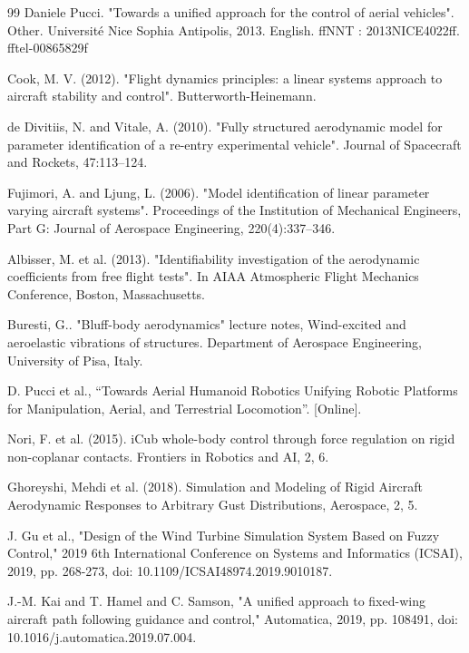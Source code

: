 \begin{thebibliography}{99}
 Daniele Pucci. "Towards a unified approach for the control of aerial vehicles". Other. Université Nice Sophia Antipolis, 2013. English. ffNNT : 2013NICE4022ff. fftel-00865829f

 Cook, M. V. (2012). "Flight dynamics principles: a linear systems approach to aircraft stability and control". Butterworth-Heinemann.

 de Divitiis, N. and Vitale, A. (2010). "Fully structured aerodynamic model for parameter identification of a re-entry experimental vehicle". Journal of Spacecraft and Rockets, 47:113–124.

 Fujimori, A. and Ljung, L. (2006). "Model identification of linear parameter varying aircraft systems". Proceedings of the Institution of Mechanical Engineers, Part G: Journal of Aerospace Engineering, 220(4):337–346.

 Albisser, M. et al. (2013). "Identifiability investigation of the aerodynamic coefficients from free flight tests". In AIAA Atmospheric Flight
Mechanics Conference, Boston, Massachusetts.

 Buresti, G.. "Bluff-body aerodynamics" lecture notes, Wind-excited and aeroelastic vibrations of structures. Department of Aerospace Engineering, University of Pisa, Italy.

  D. Pucci et al., “Towards Aerial Humanoid Robotics Unifying Robotic Platforms for Manipulation, Aerial, and Terrestrial Locomotion”. [Online]. 

 Nori, F. et al. (2015). iCub whole-body control through force regulation on rigid non-coplanar contacts. Frontiers in Robotics and AI, 2, 6.

 Ghoreyshi, Mehdi et al. (2018). Simulation and Modeling of Rigid Aircraft Aerodynamic Responses to Arbitrary Gust Distributions, Aerospace, 2, 5.

 J. Gu et al., "Design of the Wind Turbine Simulation System Based on Fuzzy Control," 2019 6th International Conference on Systems and Informatics (ICSAI), 2019, pp. 268-273, doi: 10.1109/ICSAI48974.2019.9010187.

 J.-M. Kai and T. Hamel and C. Samson, "A unified approach to fixed-wing aircraft path following guidance and control," Automatica, 2019, pp. 108491, doi: 10.1016/j.automatica.2019.07.004.





\end{thebibliography}